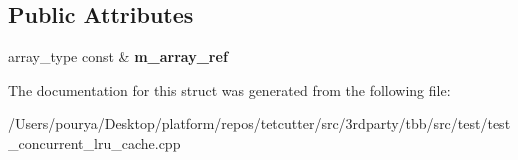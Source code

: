 \subsection*{Public Attributes}
\begin{DoxyCompactItemize}
\item 
\hypertarget{structconcurrency__tests_1_1helpers_1_1array__searcher_a8a7dfa94553b7a46cb7b997fd3fced85}{}array\+\_\+type const \& {\bfseries m\+\_\+array\+\_\+ref}\label{structconcurrency__tests_1_1helpers_1_1array__searcher_a8a7dfa94553b7a46cb7b997fd3fced85}

\end{DoxyCompactItemize}


The documentation for this struct was generated from the following file\+:\begin{DoxyCompactItemize}
\item 
/\+Users/pourya/\+Desktop/platform/repos/tetcutter/src/3rdparty/tbb/src/test/test\+\_\+concurrent\+\_\+lru\+\_\+cache.\+cpp\end{DoxyCompactItemize}
